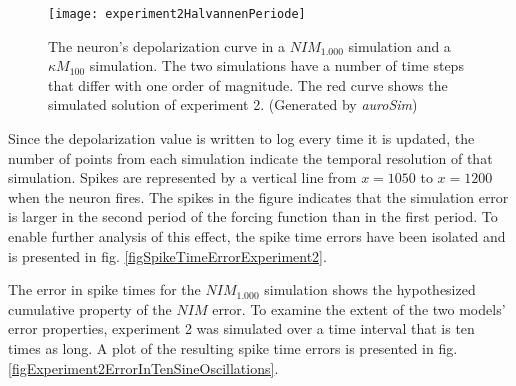 


\begin{figure}[hbt!p]
 	\centering
	\centerline{ %
 		\texttt{[image: experiment2HalvannenPeriode]}
	}
 	\caption[Simulation results of experiment 2: dynamic forcing func.]{
			 	The neuron's depolarization curve in a $NIM_{1.000}$ simulation and a $\kappa M_{100}$ simulation.
				The two simulations have a number of time steps that differ with one order of magnitude.
				The red curve shows the simulated solution of experiment 2.
				(Generated by \emph{auroSim})
			}
 	\label{figExperiment2}
\end{figure}

			
			Since the depolarization value is written to log every time it is updated, the number of points from each simulation indicate the temporal resolution of that simulation.
			Spikes are represented by a vertical line from $x=1050$ to $x=1200$ when the neuron fires.
			The spikes in the figure indicates that the simulation error is larger in the second period of the forcing function than in the first period.
 			To enable further analysis of this effect, the spike time errors have been isolated and is presented in fig. \ref{figSpikeTimeErrorExperiment2}.

			The error in spike times for the $NIM_{1.000}$ simulation shows the hypothesized cumulative property of the $NIM$ error.
			To examine the extent of the two models' error properties, experiment 2 was simulated over a time interval that is ten times as long.
			A plot of the resulting spike time errors is presented in fig. \ref{figExperiment2ErrorInTenSineOscillations}.
			
